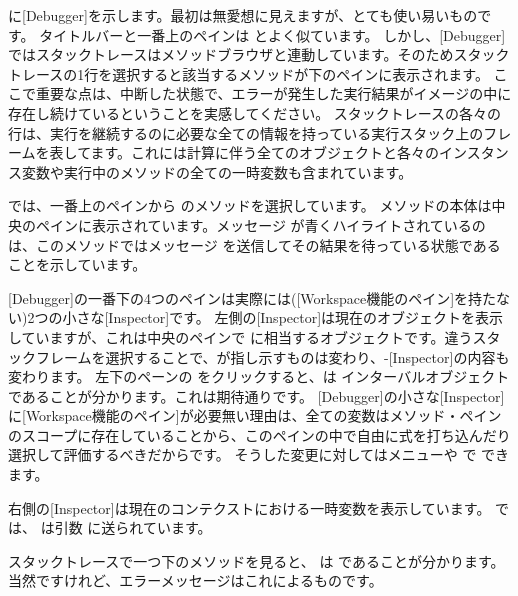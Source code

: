 \documentclass[a4paper,10pt,twoside]{book}
\begin{document}
 に[Debugger]を示します。最初は無愛想に見えますが、とても使い易いものです。
タイトルバーと一番上のペインは  とよく似ています。
しかし、[Debugger]ではスタックトレースはメソッドブラウザと連動しています。そのためスタックトレースの1行を選択すると該当するメソッドが下のペインに表示されます。
ここで重要な点は、中断した状態で、エラーが発生した実行結果がイメージの中に存在し続けているということを実感してください。
スタックトレースの各々の行は、実行を継続するのに必要な全ての情報を持っている実行スタック上のフレームを表してます。これには計算に伴う全てのオブジェクトと各々のインスタンス変数や実行中のメソッドの全ての一時変数も含まれています。

 では、一番上のペインから  のメソッドを選択しています。
メソッドの本体は中央のペインに表示されています。メッセージ  が青くハイライトされているのは、このメソッドではメッセージ  を送信してその結果を待っている状態であることを示しています。

[Debugger]の一番下の4つのペインは実際には([Workspace機能のペイン]を持たない)2つの小さな[Inspector]です。
左側の[Inspector]は現在のオブジェクトを表示していますが、これは中央のペインで \self に相当するオブジェクトです。違うスタックフレームを選択することで、\self が指し示すものは変わり、\self{}-[Inspector]の内容も変わります。
左下のペーンの \self をクリックすると、\self は インターバルオブジェクト  であることが分かります。これは期待通りです。
[Debugger]の小さな[Inspector]に[Workspace機能のペイン]が必要無い理由は、全ての変数はメソッド・ペインのスコープに存在していることから、このペインの中で自由に式を打ち込んだり選択して評価するべきだからです。
そうした変更に対してはメニューや  で  できます。

右側の[Inspector]は現在のコンテクストにおける一時変数を表示しています。
 では、 は引数  に送られています。


スタックトレースで一つ下のメソッドを見ると、 は  であることが分かります。当然ですけれど、エラーメッセージはこれによるものです。
\end{document}
